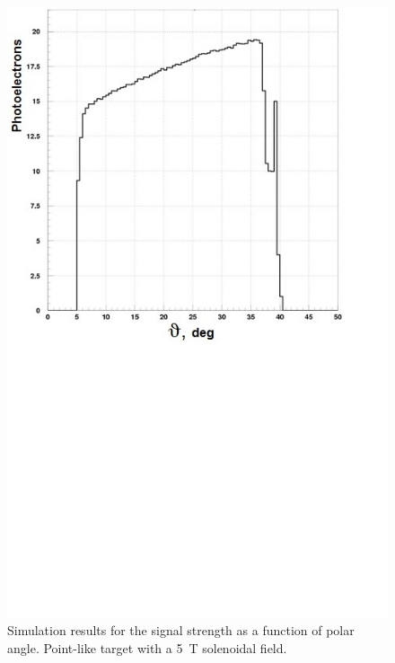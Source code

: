 \begin{figure}[!ht]
    \centering
    \includegraphics[width=1.0\linewidth,trim={0.0cm 9.4cm 0.0cm 0.0cm},clip]{images/Point_Targ_5T_Field_Theta.jpg}
    \caption{Simulation results for the signal strength as a function of polar angle. Point-like target with a 5~T
      solenoidal field.}
    \label{fig:Point_Targ_5T_Field_Theta}
\end{figure}

